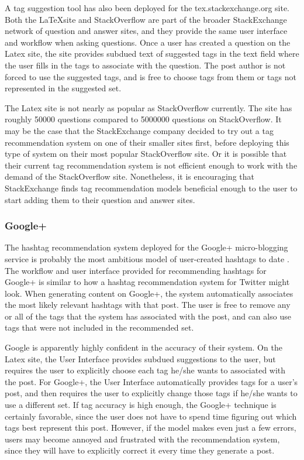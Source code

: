 \documentclass[man]{apa6}
\begin{document}
A tag suggestion tool has also been deployed for the tex.stackexchange.org site. \parencite{LatexTags2013}
Both the \LaTeX site and StackOverflow are part of the broader StackExchange network of question and answer sites, and they provide the same user interface and workflow when asking questions.
Once a user has created a question on the Latex site, the site provides subdued text of suggested tags in the text field where the user fills in the tags to associate with the question.
The post author is not forced to use the suggested tags, and is free to choose tags from them or tags not represented in the suggested set.

The Latex site is not nearly as popular as StackOverflow currently.
The site has roughly \num{50000} questions compared to \num{5000000} questions on StackOverflow.
It may be the case that the StackExchange company decided to try out a tag recommendation system on one of their smaller sites first, before deploying this type of system on their most popular StackOverflow site.
Or it is possible that their current tag recommendation system is not efficient enough to work with the demand of the StackOverflow site.
Nonetheless, it is encouraging that StackExchange finds tag recommendation models beneficial enough to the user to start adding them to their question and answer sites. 

\subsubsection{Google+}

The hashtag recommendation system deployed for the Google+ micro-blogging service is probably the most ambitious model of user-created hashtags to date \parencite{GoogleKeynote2013}.
The workflow and user interface provided for recommending hashtags for Google+ is similar to how a hashtag recommendation system for Twitter might look.
When generating content on Google+, the system automatically associates the most likely relevant hashtags with that post.
The user is free to remove any or all of the tags that the system has associated with the post, and can also use tags that were not included in the recommended set.

Google is apparently highly confident in the accuracy of their system.
On the Latex site, the User Interface provides subdued suggestions to the user, but requires the user to explicitly choose each tag he/she wants to associated with the post.
For Google+, the User Interface automatically provides tags for a user's post, and then requires the user to explicitly change those tags if he/she wants to use a different set.
If tag accuracy is high enough, the Google+ technique is certainly favorable, since the user does not have to spend time figuring out which tags best represent this post.
However, if the model makes even just a few errors, users may become annoyed and frustrated with the recommendation system, since they will have to explicitly correct it every time they generate a post.
\end{document}
